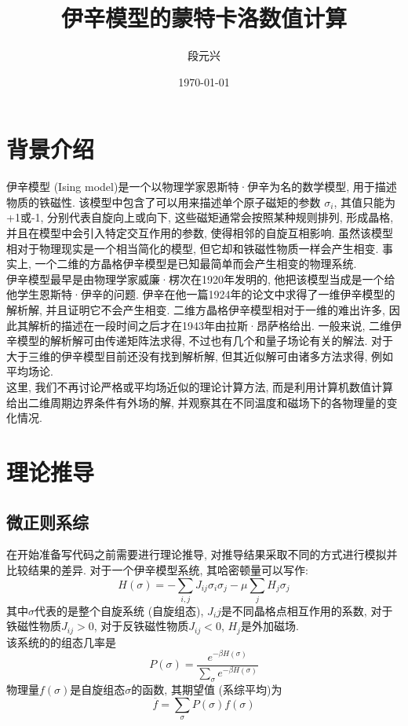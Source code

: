 \documentclass[UTF8]{ctexart}
\title{伊辛模型的蒙特卡洛数值计算}
\author{段元兴}
\date{\today}
\begin{document}
\maketitle
\thispagestyle{empty}
\setcounter{page}{1}
\newpage
\tableofcontents
\newpage
    \section{背景介绍}
        \indent 伊辛模型 (Ising model)是一个以物理学家恩斯特·伊辛为名的数学模型, 用于描述物质的铁磁性.
        该模型中包含了可以用来描述单个原子磁矩的参数 $\sigma _{i}$, 其值只能为+1或-1, 分别代表自旋向上或向下,
        这些磁矩通常会按照某种规则排列, 形成晶格, 并且在模型中会引入特定交互作用的参数, 使得相邻的自旋互相影响.
        虽然该模型相对于物理现实是一个相当简化的模型, 但它却和铁磁性物质一样会产生相变.
        事实上, 一个二维的方晶格伊辛模型是已知最简单而会产生相变的物理系统.\\
        \indent 伊辛模型最早是由物理学家威廉·楞次在1920年发明的, 他把该模型当成是一个给他学生恩斯特·伊辛的问题.
        伊辛在他一篇1924年的论文中求得了一维伊辛模型的解析解, 并且证明它不会产生相变. 二维方晶格伊辛模型相对于一维的难出许多,
        因此其解析的描述在一段时间之后才在1943年由拉斯·昂萨格给出. 一般来说, 二维伊辛模型的解析解可由传递矩阵法求得,
        不过也有几个和量子场论有关的解法. 对于大于三维的伊辛模型目前还没有找到解析解, 但其近似解可由诸多方法求得, 例如平均场论.\\
        \indent 这里, 我们不再讨论严格或平均场近似的理论计算方法, 而是利用计算机数值计算给出二维周期边界条件有外场的解,
        并观察其在不同温度和磁场下的各物理量的变化情况.
    \section{理论推导}
        \subsection{微正则系综}
            \indent 在开始准备写代码之前需要进行理论推导, 对推导结果采取不同的方式进行模拟并比较结果的差异. 对于一个伊辛模型系统,
            其哈密顿量可以写作:
            \begin{equation}
                H(\sigma)=-\sum\limits_{i,j}J_{ij}\sigma_i\sigma_j-\mu\sum\limits_jH_j\sigma_j
            \end{equation}
            其中$\sigma$代表的是整个自旋系统 (自旋组态), $J_ij$是不同晶格点相互作用的系数, 对于铁磁性物质$J_{ij}>0$, 对于反铁磁性物质$J_{ij}<0$,
            $H_j$是外加磁场.\\
            \indent 该系统的的组态几率是
            \begin{equation}
                P(\sigma)=\dfrac{e^{-\beta H(\sigma)}}{\sum\limits_\sigma e^{-\beta H(\sigma)}}
            \end{equation}
            物理量$f(\sigma)$是自旋组态$\sigma$的函数, 其期望值 (系综平均)为
            \begin{equation}
                \overline{f}=\sum\limits_\sigma P(\sigma)f(\sigma)
            \end{equation}
\end{document}
